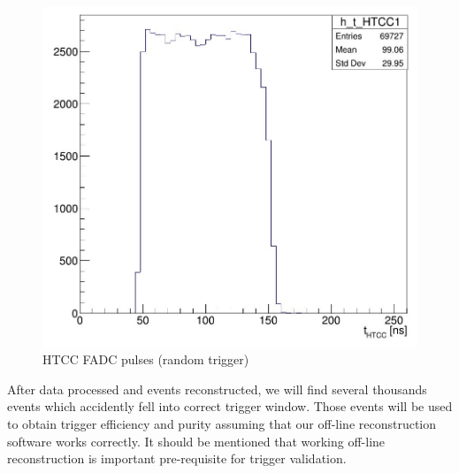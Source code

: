\begin{figure}[hbt]
	\centering
	\includegraphics[width=1.0\columnwidth,keepaspectratio]{img/htcc_fadc2.png}
	\caption{HTCC FADC pulses (random trigger)}
	\label{fig:htcc_fadc2}
\end{figure}

 After data processed and events reconstructed, we will find several thousands events which accidently fell into correct trigger window. Those events will be used to obtain trigger efficiency and purity assuming that our off-line reconstruction software works correctly. It should be mentioned that working off-line reconstruction is important pre-requisite for trigger validation.
 